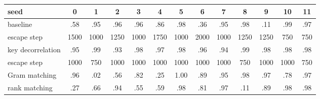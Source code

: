 \begin{tabular}{lcccccccccccc}
\toprule
seed & 0 & 1 & 2 & 3 & 4 & 5 & 6 & 7 & 8 & 9 & 10 & 11 \\
\midrule
baseline & .58 & .95 & .96 & .96 & .86 & .98 & .36 & .95 & .98 & .11 & .99 & .97 \\
\quad escape step & 1500 & 1000 & 1250 & 1000 & 1750 & 1000 & 2000 & 1000 & 1250 & 1250 & 750 & 750 \\
key decorrelation & .95 & .99 & .93 & .98 & .97 & .98 & .96 & .94 & .99 & .98 & .98 & .98 \\
\quad escape step & 1000 & 750 & 1000 & 1000 & 1000 & 1000 & 1000 & 1000 & 750 & 1000 & 1000 & 750 \\
Gram matching & .96 & .02 & .56 & .82 & .25 & 1.00 & .89 & .95 & .98 & .97 & .78 & .97 \\
rank matching & .27 & .66 & .94 & .55 & .59 & .98 & .81 & .97 & .11 & .89 & .98 & .98 \\
\bottomrule
\end{tabular}
